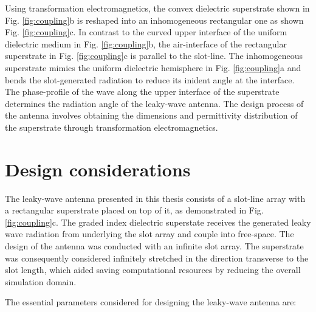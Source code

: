 Using transformation electromagnetics, the convex dielectric superstrate shown in Fig. \ref{fig:coupling}b is reshaped into an inhomogeneous rectangular one as shown Fig. \ref{fig:coupling}c. In contrast to the curved upper interface of the uniform dielectric medium in Fig. \ref{fig:coupling}b, the air-interface of the rectangular superstrate in Fig. \ref{fig:coupling}c is parallel to the slot-line. The inhomogeneous superstrate mimics the uniform dielectric hemisphere in Fig. \ref{fig:coupling}a and bends the slot-generated radiation to reduce its inident angle at the interface. The phase-profile of the wave along the upper interface of the superstrate determines the radiation angle of the leaky-wave antenna. The design process of the antenna involves obtaining the dimensions and permittivity distribution of the superstrate through transformation electromagnetics. 


\section{Design considerations} 
The leaky-wave antenna presented in this thesis consists of a slot-line array with a rectangular superstrate placed on top of it, as demonstrated in Fig. \ref{fig:coupling}c. The graded index dielectric superstate receives the generated leaky wave radiation from underlying the slot array and couple into free-space. The design of the antenna was conducted with an infinite slot array. The superstrate was consequently considered infinitely stretched in the direction transverse to the slot length, which aided saving computational resources by reducing the overall simulation domain.

The essential parameters considered for designing the leaky-wave antenna are:

